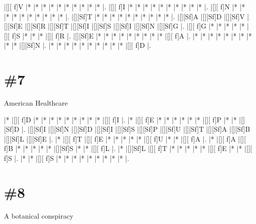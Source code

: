 \documentclass[letterpaper]{article}
\begin{document}
\vspace*{1em}
\begin{Puzzle}{11}{9}
|[][ f]V  |*        |*        |*        |*        |*        |*        |*        |*        |*        |*        |. 
|[][ f]I  |*        |*        |*        |*        |*        |*        |*        |*        |*        |*        |.  
|[][ f]N  |*        |*        |*        |*        |*        |*        |*        |*        |*        |*        |.
|[][Sf]T  |*        |*        |*        |*        |*        |*        |*        |*        |*        |*        |.  
|[][Sf]A  |[][Sf]D  |[][Sf]V  |[][Sf]E  |[][Sf]R  |[][Sf]T  |[][Sf]I  |[][Sf]S  |[][Sf]I  |[][Sf]N  |[][Sf]G  |.
|[][ f]G  |*        |*        |*        |*        |*        |[][ f]S  |*        |*        |*        |[][ f]R  |. 
|[][Sf]E  |*        |*        |*        |*        |*        |*        |*        |*        |*        |[][ f]A  |.
|*        |*        |*        |*        |*        |*        |*        |*        |*        |*        |[][Sf]N  |.
|*        |*        |*        |*        |*        |*        |*        |*        |*        |*        |[][ f]D  |.
\end{Puzzle}

\section*{\#7}
American Healthcare

\vspace*{1em}
\begin{Puzzle}{12}{7}
|*        |[][ f]D  |*        |*        |*        |*        |*        |*        |*        |*        |*        |[][ f]I  |.
|*        |[][ f]E  |*        |*        |*        |*        |*        |*        |[][ f]P  |*        |*        |[][Sf]D  |.  
|[][Sf]I  |[][Sf]N  |[][Sf]D  |[][Sf]I  |[][Sf]S  |[][Sf]P  |[][Sf]U  |[][Sf]T  |[][Sf]A  |[][Sf]B  |[][Sf]L  |[][Sf]E  |.
|*        |[][ f]T  |[][ f]E  |*        |*        |*        |*        |*        |[][ f]U  |*        |*        |[][ f]A  |. 
|*        |[][ f]A  |[][ f]B  |*        |*        |*        |*        |*        |[][Sf]S  |*        |*        |[][ f]L  |.
|*        |[][Sf]L  |[][ f]T  |*        |*        |*        |*        |*        |[][ f]E  |*        |*        |[][ f]S  |.
|*        |*        |[][ f]S  |*        |*        |*        |*        |*        |*        |*        |*        |*        |.
\end{Puzzle}

\section*{\#8}
A botanical conspiracy
\end{document}
